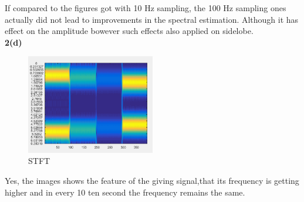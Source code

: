 \documentclass[twoside]{article}
\begin{document}
If compared to the figures got with 10 Hz sampling, the 100 Hz sampling ones actually did not lead to improvements in the spectral estimation. Although it has effect on the amplitude bowever such effects also applied on sidelobe.\\

\noindent \textbf {2(d)}\\
\begin{figure}[H]
   \centering
   \includegraphics[width = 0.5\textwidth]{./data/2(d).png}  
   \caption{STFT}
\end{figure}
Yes, the images shows the feature of the giving signal,that its frequency is getting higher and in every 10 ten second the frequency remains the same.\\
\end{document}
